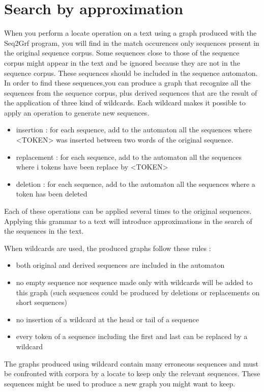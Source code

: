 \section{Search by approximation} 
\label{approximation}

When you perform a locate operation on a text using a graph produced with the Seq2Grf program, you will find in the match occurences only sequences present in the original sequence corpus.
Some sequences close to those of the sequence corpus might appear in the text and be ignored because they are not in the sequence corpus. 
These sequences should be included in the sequence automaton.
In order to find these sequences,you can produce a graph that recognize all the sequences from the sequence corpus, plus derived sequences that are the result of the application of three kind of wildcards.
Each wildcard makes it possible to apply an operation to generate new sequences.

\begin{itemize}
	\item insertion : for each sequence, add to the automaton all the sequences where <TOKEN> was inserted between two words of the original sequence.
	\item replacement : for each sequence, add to the automaton all the sequences where i tokens have been replace by <TOKEN>
	\item deletion : for each sequence, add to the automaton all the sequences where a token has been deleted
\end{itemize}
Each of these operations can be applied several times to the original sequences.
Applying this grammar to a text will introduce approximations in the search of the sequences in the text.

When wildcards are used, the produced graphs follow these rules :
\begin{itemize}
	\item both original and derived sequences are included in the automaton
	\item no empty sequence nor sequence made only with wildcards will be added to this graph (such sequences could be produced by deletions or replacements on short sequences)
	\item no insertion of a wildcard at the head or tail of a sequence
	\item every token of a sequence including the first and last can be replaced by a wildcard
\end{itemize}
The graphs produced using wildcard contain many erroneous sequences and must be confronted with corpora by a locate to keep only the relevant sequences. These sequences might be used to produce a new graph you might want to keep.

